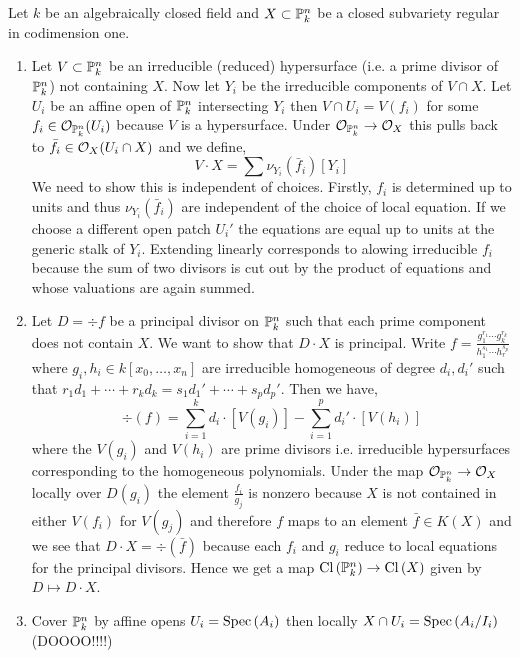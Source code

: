 \documentclass[12pt]{article}
\begin{document}
Let $k$ be an algebraically closed field and $X \subset \P^n_k$ be a closed subvariety regular in codimension one.

\begin{enumerate}
\item Let $V \subset \P^n_k$ be an irreducible (reduced) hypersurface (i.e. a prime divisor of $\P^n_k$) not containing $X$. Now let $Y_i$ be the irreducible components of $V \cap X$. Let $U_i$ be an affine open of $\P^n_k$ intersecting $Y_i$ then $V \cap U_i = V(f_i)$ for some $f_i \in \struct{\P^n_k}(U_i)$ because $V$ is a hypersurface. Under $\struct{\P^n_k} \to \struct{X}$ this pulls back to $\bar{f}_i \in \struct{X}(U_i \cap X)$ and we define,
\[ V \cdot X = \sum \nu_{Y_i}(\bar{f}_i) [Y_i] \]
We need to show this is independent of choices. Firstly, $f_i$ is determined up to units and thus $\nu_{Y_i}(\bar{f}_i)$ are independent of the choice of local equation. If we choose a different open patch $U_i'$ the equations are equal up to units at the generic stalk of $Y_i$. Extending linearly corresponds to alowing irreducible $f_i$ because the sum of two divisors is cut out by the product of equations and whose valuations are again summed.

\item Let $D = \div{f}$ be a principal divisor on $\P^n_k$ such that each prime component does not contain $X$. We want to show that $D \cdot X$ is principal. Write $f = \frac{g_1^{r_1} \cdots g_k^{r_k}}{h_1^{s_1} \cdots h_r^{s_p}}$ where $g_i,h_i \in k[x_0, \dots, x_n]$ are irreducible homogeneous of degree $d_i, d_i'$ such that $r_1 d_1 + \cdots + r_k d_k = s_1 d_1' + \cdots + s_p d_p'$. Then we have,
\[ \div{(f)} = \sum_{i = 1}^k d_i \cdot [V(g_i)] - \sum_{i = 1}^p d_i' \cdot [V(h_i)] \]
where the $V(g_i)$ and $V(h_i)$ are prime divisors i.e. irreducible hypersurfaces corresponding to the homogeneous polynomials. Under the map $\struct{\P^n_k} \to \struct{X}$ locally over $D(g_i)$ the element $\frac{f_i}{g_j}$ is nonzero because $X$ is not contained in either $V(f_i)$ for $V(g_j)$ and therefore $f$ maps to an element $\bar{f} \in K(X)$ and we see that $D \cdot X = \div{(\bar{f})}$ because each $f_i$ and $g_i$ reduce to local equations for the principal divisors. Hence we get a map $\Cl{\P^n_k} \to \Cl{X}$ given by $D \mapsto D \cdot X$.

\item Cover $\P^n_k$ by affine opens $U_i = \Spec{A_i}$ then locally $X \cap U_i = \Spec{A_i / I_i}$ (DOOOO!!!!)


\end{enumerate}
\end{document}
